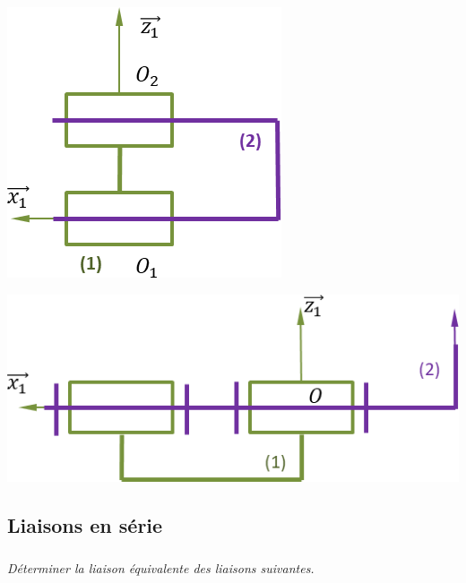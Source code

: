 \documentclass[10pt,fleqn]{article} %
\begin{document}
\begin{multicols}{2}
\begin{multicols}{2}
\begin{center}
\includegraphics[width=.5\linewidth]{images/fig_09.png}
\end{center}

\begin{center}
\includegraphics[width=.8\linewidth]{images/fig_10.png}
\end{center}


\subsection*{Liaisons en série}

\subparagraph{}
\textit{Déterminer la liaison équivalente des liaisons suivantes.}



\end{multicols}
\end{multicols}
\end{document}
